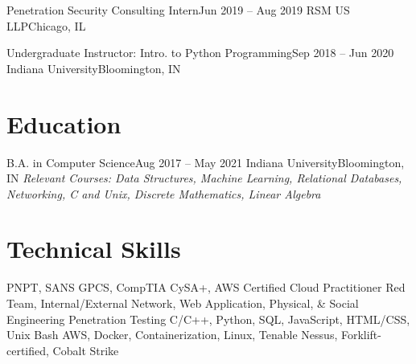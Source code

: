 \documentclass{resume}
\begin{document}
  \resumeEntryStart
    \resumeEntryTSDL
    {Penetration Security Consulting Intern}{Jun 2019 -- Aug 2019}
    {RSM US LLP}{Chicago, IL}
    \resumeItemListStart
    \resumeItemListEnd
  \resumeEntryEnd

  \resumeEntryStart
    \resumeEntryTSDL
    {Undergraduate Instructor: Intro. to Python Programming}{Sep 2018 -- Jun 2020}
    {Indiana University}{Bloomington, IN}
    \resumeItemListStart
    \resumeItemListEnd
  \resumeEntryEnd

\section{Education}

  \resumeEntryStart
    \resumeEntryTSDL
    {B.A. in Computer Science}{Aug 2017 -- May 2021}
    {Indiana University}{Bloomington, IN}
      {\newline{}\newline{}\scriptsize \textit{ \footnotesize{Relevant Courses: Data Structures, Machine Learning, Relational Databases, Networking, C and Unix, Discrete Mathematics, Linear Algebra}}}
  \resumeEntryEnd

\section{Technical Skills}
 \resumeTechnicalEntryStart
   {PNPT, SANS GPCS, CompTIA CySA+, AWS Certified Cloud Practitioner}
   {Red Team, Internal/External Network, Web Application, Physical, \& Social Engineering Penetration Testing}
   {C/C++, Python, SQL, JavaScript, HTML/CSS, Unix Bash}
   {AWS, Docker, Containerization, Linux, Tenable Nessus, Forklift-certified, Cobalt Strike}
  \resumeTechnicalEntryEnd
\end{document}
